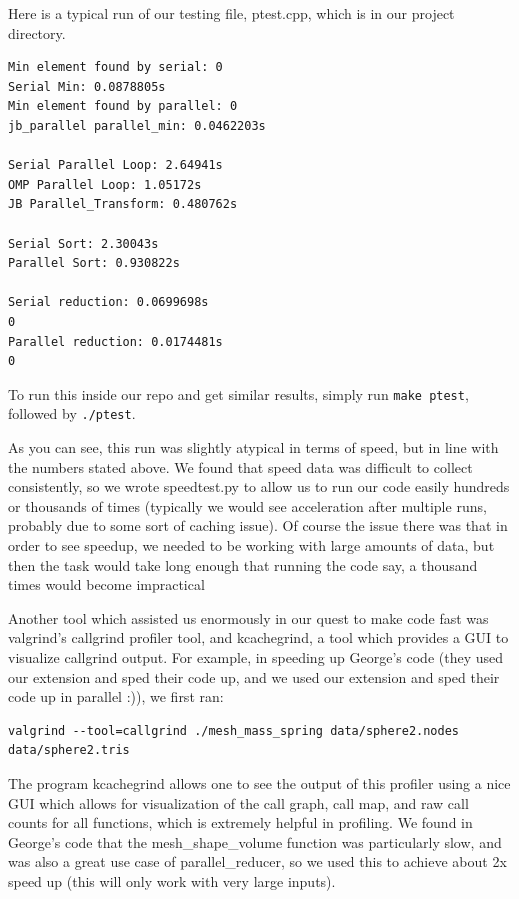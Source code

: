 \documentclass{article}
\begin{document}
Here is a typical run of our testing file, ptest.cpp, which is in our project directory.

\begin{verbatim}
Min element found by serial: 0
Serial Min: 0.0878805s
Min element found by parallel: 0
jb_parallel parallel_min: 0.0462203s

Serial Parallel Loop: 2.64941s
OMP Parallel Loop: 1.05172s
JB Parallel_Transform: 0.480762s

Serial Sort: 2.30043s
Parallel Sort: 0.930822s

Serial reduction: 0.0699698s
0
Parallel reduction: 0.0174481s
0
\end{verbatim}

To run this inside our repo and get similar results, simply run \texttt{make ptest}, followed by \texttt{./ptest}.

As you can see, this run was slightly atypical in terms of speed, but in line with the numbers stated above.  We found that speed data was difficult to collect consistently, so we wrote speedtest.py to allow us to run our code easily hundreds or thousands of times (typically we would see acceleration after multiple runs, probably due to some sort of caching issue).  Of course the issue there was that in order to see speedup, we needed to be working with large amounts of data, but then the task would take long enough that running the code say, a thousand times would become impractical

Another tool which assisted us enormously in our quest to make code fast was valgrind's callgrind profiler tool, and kcachegrind, a tool which provides a GUI to visualize callgrind output.  For example, in speeding up George's code (they used our extension and sped their code up, and we used our extension and sped their code up in parallel :)), we first ran:

\begin{verbatim}
valgrind --tool=callgrind ./mesh_mass_spring data/sphere2.nodes data/sphere2.tris
\end{verbatim}

The program kcachegrind allows one to see the output of this profiler using a nice GUI which allows for visualization of the call graph, call map, and raw call counts for all functions, which is extremely helpful in profiling.  We found in George's code that the mesh\_shape\_volume function was particularly slow, and was also a great use case of parallel\_reducer, so we used this to achieve about 2x speed up (this will only work with very large inputs). 
\end{document}

